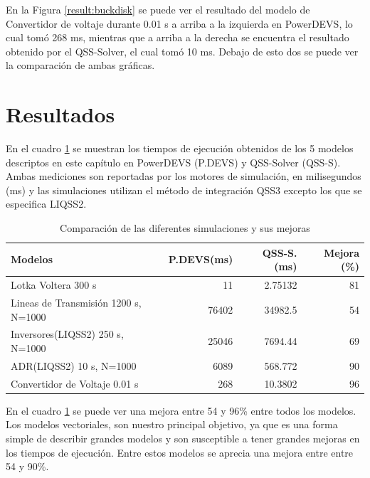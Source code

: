 En la Figura \ref{result:buckdisk} se puede ver el resultado del modelo de Convertidor de voltaje durante 0.01 s a arriba a la izquierda en PowerDEVS, 
	lo cual tomó 268 ms, mientras que a arriba a la derecha se encuentra el resultado obtenido por el QSS-Solver, el cual tomó 10 ms.  Debajo de esto dos se 
	puede ver la comparación de ambas gráficas.

\section{Resultados}

	En el cuadro \ref{tab:result} se muestran los tiempos de ejecución obtenidos de los 5 modelos descriptos en este capítulo en  
	PowerDEVS (P.DEVS) y QSS-Solver (QSS-S). Ambas mediciones son reportadas por los motores de simulación, en milisegundos (ms) y
	las simulaciones utilizan el método de integración QSS3 excepto los que se especifica LIQSS2.

\begin{table}[H]
\centering	
\begin{tabular}{lrrr}
\toprule
{\bf Modelos}            &  {\bf P.DEVS(ms)} & {\bf QSS-S. (ms)} & {\bf Mejora (\%)} \\
\toprule
Lotka  Voltera 300 s      		& 11            & 2.75132         & 81 \\
Lineas de Transmisión 1200 s, N=1000     & 76402         & 34982.5         & 54          \\
Inversores(LIQSS2) 250 s, N=1000   	& 25046         & 7694.44         & 69        \\
ADR(LIQSS2) 10 s, N=1000 		& 6089          & 568.772         & 90        \\
Convertidor de Voltaje 0.01 s        	& 268           & 10.3802         & 96         

\end{tabular}
\caption{Comparación de las diferentes simulaciones y sus mejoras}\label{tab:result}
\end{table}

	En el cuadro \ref{tab:result} se puede ver una mejora entre 54 y 96\% entre todos los modelos.
	Los modelos vectoriales, son nuestro principal objetivo, ya que es una forma simple de describir grandes modelos y son susceptible a tener grandes mejoras
	en los tiempos de ejecución. Entre estos modelos se aprecia una mejora entre entre 54 y 90\%.
